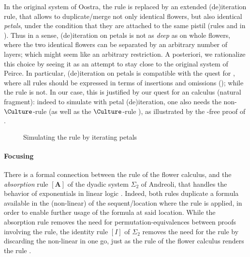\begin{scope}
In the original  system of Oostra, the  rule is replaced by an
extended (de)iteration rule, that allows to duplicate/merge not only identical
flowers, but also identical \emph{petals}, under the condition that they are
attached to the same pistil (rules 
and  in ). Thus in a sense, (de)iteration
on petals is not as \emph{deep} as on whole flowers, where the two identical
flowers can be separated by an arbitrary number of layers; which might seem like
an arbitrary restriction. A posteriori, we rationalize this choice by seeing it
as an attempt to stay close to the original system  of Peirce. In
particular, (de)iteration on petals is compatible with the quest for
\emph{}, where all rules should be expressed in terms of
insertions and omissions (); while the  rule is not.
In our case, this is justified by our quest for an \emph{} calculus
(natural fragment): indeed to simulate  with petal (de)iteration, one
also needs the non- $\Culture$-rule  (as well as the
$\Culture$-rule ), as illustrated by the -free proof of
.

\begin{figure}
  
  \caption{Simulating the  rule by iterating petals}
\end{figure}

\paragraph{Focusing}

There is a formal connection between the  rule of the flower
calculus, and the \emph{absorption} rule $[\mathbf{A}]$ of the dyadic system
$\Sigma_2$ of Andreoli, that handles the  behavior of exponentials in
linear logic . Indeed, both rules duplicate a formula
available in the (non-linear)  of the sequent/location where the rule is
applied, in order to enable further usage of the formula at said location. While
the absorption rule removes the need for permutation-equivalences between proofs
involving the \emph{} rule, the identity rule $[I]$ of $\Sigma_2$
removes the need for the \emph{} rule by discarding the non-linear
 in one go, just as the  rule of the flower calculus renders
the  rule .


\end{scope}

